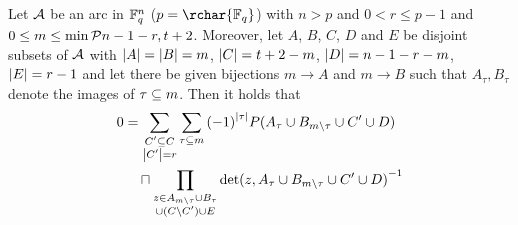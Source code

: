 \begin{lemma}
    Let $\mathcal{A}$ be an arc in $\mathbb{F}_{q}^n$ ($p=\rchar{\field{q}}$) with $n>p$ and $0< r\leq p-1$ and $0\leq m\leq \min\set{n-1-r,t+2}$. Moreover, let $A$, $B$, $C$, $D$ and $E$ be disjoint subsets of $\mathcal{A}$ with $\left|A\right|=\left|B\right|=m$, $\left|C\right|=t+2-m$, $\left|D\right|=n-1-r-m$, $\left|E\right|=r-1$ and let there be given bijections $m\to A$ and $m\to B$ such that $A_\tau, B_\tau$ denote the images of $\tau\subseteq m$. Then it holds that
    \begin{align*}
        0 & = \sum_{\substack{C'\setleq C                                                                       \\
                \card{C'}=r}}
        {\sum_{\tau\setleq m}{{(-1)}^{\card{\tau}}P(A_{\tau}\setjoin B_{m\setminus\tau}\setjoin C'\setjoin D)}} \\
          & \quad\setprod\prod_{\substack{z\in A_{m\setminus\tau}\setjoin B_{\tau}                                  \\
                  \setjoin(C\setminus C')\setjoin E}}
          {{\det(z,A_{\tau}\setjoin B_{m\setminus\tau}\setjoin C'\setjoin D)}^{-1}}
\end{align*}
\end{lemma}
